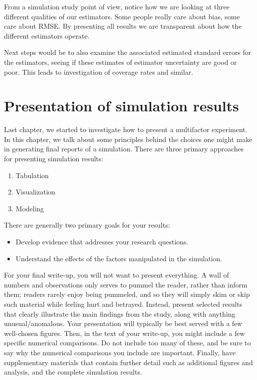 \documentclass[
]{book}
\providecommand{\tightlist}{%
  \setlength{\itemsep}{0pt}\setlength{\parskip}{0pt}}
\begin{document}
From a simulation study point of view, notice how we are looking at three
different qualities of our estimators. Some people really care about bias,
some care about RMSE. By presenting all results we are transparent about how
the different estimators operate.

Next steps would be to also examine the associated estimated standard errors
for the estimators, seeing if these estimates of estimator uncertainty are
good or poor. This leads to investigation of coverage rates and similar.

\chapter{Presentation of simulation results}\label{presentation-of-simulation-results}

Last chapter, we started to investigate how to present a multifactor experiment.
In this chapter, we talk about some principles behind the choices one might make in generating final reports of a simulation.
There are three primary approaches for presenting simulation results:

\begin{enumerate}
\def\labelenumi{\arabic{enumi}.}
\tightlist
\item
  Tabulation
\item
  Visualization
\item
  Modeling
\end{enumerate}

There are generally two primary goals for your results:

\begin{itemize}
\tightlist
\item
  Develop evidence that addresses your research questions.
\item
  Understand the effects of the factors manipulated in the simulation.
\end{itemize}

For your final write-up, you will not want to present everything.
A wall of numbers and observations only serves to pummel the reader, rather than inform them; readers rarely enjoy being pummeled, and so they will simply skim or skip such material while feeling hurt and betrayed.
Instead, present selected results that clearly illustrate the main findings from the study, along with anything unusual/anomalous.
Your presentation will typically be best served with a few well-chosen figures.
Then, in the text of your write-up, you might include a few specific numerical comparisons.
Do not include too many of these, and be sure to say why the numerical comparisons you include are important.
Finally, have supplementary materials that contain further detail such as additional figures and analysis, and the complete simulation results.
\end{document}
